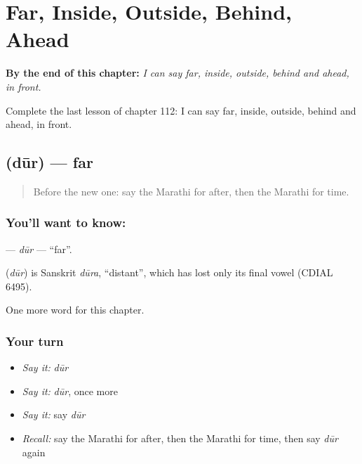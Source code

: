 
\chapter{Far, Inside, Outside, Behind, Ahead}
\label{ch:mr-far-inside-outside-behind-ahead}

\begin{chapteropening}
\textbf{By the end of this chapter:} \emph{I can say far, inside, outside, behind and ahead, in front.}

Complete the last lesson of chapter 112: I can say far, inside, outside, behind and ahead, in front.
\end{chapteropening}

\section[\texorpdfstring{\mr{दूर} (dūr)}{दूर (dūr)}]{ (dūr) — far}

\label{lesson:MR-C112-dur}



\begin{quote}
Before the new one: say the Marathi for after, then the Marathi for time.
\end{quote}

\subsection*{You'll want to know: }
\textbf{} — \emph{dūr} — \textquotedblleft{}far\textquotedblright{}.

\begin{cousinweb}
\textbf{} (\emph{dūr}) is Sanskrit \emph{dūra}, \textquotedblleft{}distant\textquotedblright{}, which has lost only its final vowel (CDIAL 6495).
\end{cousinweb}

\begin{grammarlens}[title={What you've built}]
One more word for this chapter.
\end{grammarlens}

\subsection*{Your turn}
\begin{itemize}
\raggedright
  \item \emph{Say it:} \emph{dūr}
  \item \emph{Say it:} \emph{dūr}, once more
  \item \emph{Say it:} say \emph{dūr}
  \item \emph{Recall:} say the Marathi for after, then the Marathi for time, then say \emph{dūr} again
\end{itemize}

